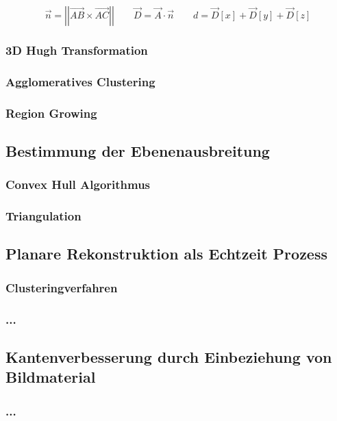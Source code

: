 \begin{equation}\label{eq:normalform}
\vec{n} =\left|\left| \vec{AB} \times \vec{AC}\right|\right|
\qquad
\vec{D} = \vec{A} \cdot \vec{n}
\qquad
d = \vec{D}\left[x\right] + \vec{D}\left[y\right] + \vec{D}\left[z\right]
\end{equation}


\subsubsection{3D Hugh Transformation}

\subsubsection{Agglomeratives Clustering}

\subsubsection{Region Growing}

\subsection{Bestimmung der Ebenenausbreitung}

\subsubsection{Convex Hull Algorithmus}

\subsubsection{Triangulation}

\subsection{Planare Rekonstruktion als Echtzeit Prozess}

\subsubsection{Clusteringverfahren}

\subsubsection{...}

\subsection{Kantenverbesserung durch Einbeziehung von Bildmaterial}

\subsubsection{...}